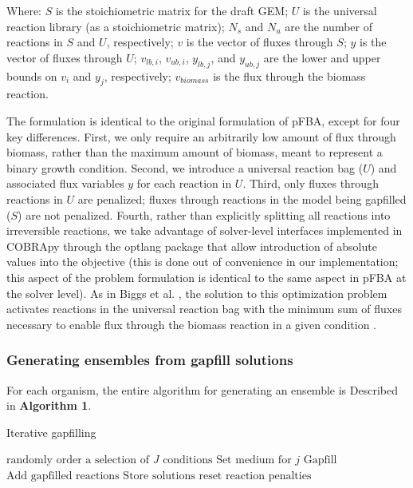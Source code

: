 \documentclass[11pt,onecolumn,notitlepage,openany,twoside]{book}
\begin{document}
\begin{refsection}
Where:
  $S$ is the stoichiometric matrix for the draft GEM;
	$U$ is the universal reaction library (as a stoichiometric matrix);
	$N_s$ and $N_u$ are the number of reactions in $S$ and $U$, respectively;
	$v$ is the vector of fluxes through $S$;
 	$y$ is the vector of fluxes through $U$;
	$v_{lb,i}$, $v_{ub,i}$, $y_{lb,j}$, and $y_{ub,j}$ are the lower and upper bounds on $v_i$ and $y_j$, respectively;
	$v_{biomass}$ is the flux through the biomass reaction.

The formulation is identical to the original formulation of pFBA, except for four key differences. First, we only require an arbitrarily low amount of flux through biomass, rather than the maximum amount of biomass, meant to represent a binary growth condition. Second, we introduce a universal reaction bag ($U$) and associated flux variables $y$ for each reaction in $U$. Third, only fluxes through reactions in $U$ are penalized; fluxes through reactions in the model being gapfilled ($S$) are not penalized. Fourth, rather than explicitly splitting all reactions into irreversible reactions, we take advantage of solver-level interfaces implemented in COBRApy through the optlang package \cite{Jensen2016-nu} that allow introduction of absolute values into the objective (this is done out of convenience in our implementation; this aspect of the problem formulation is identical to the same aspect in pFBA at the solver level). As in Biggs et al. , the solution to this optimization problem activates reactions in the universal reaction bag with the minimum sum of fluxes necessary to enable flux through the biomass reaction in a given condition \cite{Biggs2017-md}.

\subsubsection{Generating ensembles from gapfill solutions}

For each organism, the entire algorithm for generating an ensemble is Described in \textbf{Algorithm 1}.

\begin{algorithm}
  \caption{Iterative gapfilling}
  \begin{algorithmic}[1]
      \State $\mbox{randomly order a selection of $J$ conditions}$
        \State $\mbox{Set medium for $j$}$
        \State $\mbox{Gapfill}$
        \State $\mbox{Add gapfilled reactions}$
      \EndFor
      \State $\mbox{Store solutions}$
      \State $\mbox{reset reaction penalties}$
    \EndFor
  \end{algorithmic}
\end{algorithm}


\end{refsection}
\end{document}
